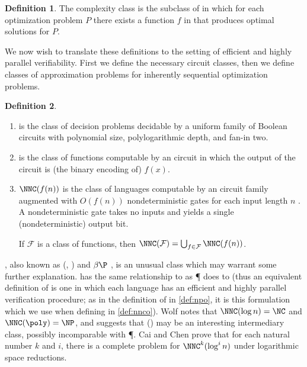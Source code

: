 \documentclass[]{article}
\theoremstyle{definition} \newtheorem{definition}{Definition}
\theoremstyle{definition} \newtheorem{openquestion}{Open question}
\begin{document}
\begin{definition}
  The complexity class \PO{} is the subclass of \NPO{} in which for each optimization problem $P$ there exists a function $f$ in \FP{} that produces optimal solutions for $P$.
\end{definition}

We now wish to translate these definitions to the setting of efficient and highly parallel verifiability.
First we define the necessary circuit classes, then we define classes of approximation problems for inherently sequential optimization problems.

\begin{definition}
  \mbox{}
  \begin{enumerate}
  \item \NC{} is the class of decision problems decidable by a uniform family of Boolean circuits with polynomial size, polylogarithmic depth, and fan-in two.
  \item \FNC{} is the class of functions computable by an \NC{} circuit in which the output of the circuit is (the binary encoding of) $f(x)$.
  \item $\NNC(f(n))$ is the class of languages computable by an \NC{} circuit family augmented with $O(f(n))$ nondeterministic gates for each input length $n$ \cite{wolf94}.
    A nondeterministic gate takes no inputs and yields a single (nondeterministic) output bit.

    If $\mathcal{F}$ is a class of functions, then $\NNC(\mathcal{F})=\bigcup_{f\in\mathcal{F}}{\NNC(f(n))}$.
  \end{enumerate}
\end{definition}

\NNCpoly, also known as \GC(\poly, \NC) \cite{cc97} and $\beta\P$ \cite{kf80}, is an unusual class which may warrant some further explanation.
\NC{} has the same relationship to \NNCpoly{} as \P{} does to \NP{} (thus an equivalent definition of \NNCpoly{} is one in which each language has an efficient and highly parallel verification procedure; as in the definition of \NPO{} in \autoref{def:npo}, it is this formulation which we use when defining \NNCO{} in \autoref{def:nnco}).
Wolf \cite{wolf94} notes that $\NNC(\log n)=\NC$ and $\NNC(\poly)=\NP$, and suggests that \NNC(\polylog) may be an interesting intermediary class, possibly incomparable with \P.
Cai and Chen \cite{cc97} prove that for each natural number $k$ and $i$, there is a complete problem for $\NNC^k(\log^i n)$ under logarithmic space reductions.
\end{document}
